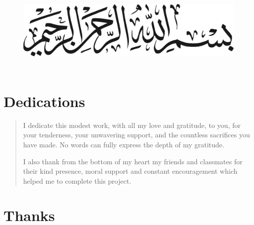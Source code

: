 \documentclass[12pt,a4paper]{report}
\begin{document}
\begin{figure}[H]
\centering
\includegraphics[width=6.6277in,height=1.65729in]{vertopal_d1b0b2209edd4c6aa8254f57daa0953b/media/image3.png}
\end{figure}


\clearpage
\hypertarget{dedications}{%
\section{\texorpdfstring{\textbf{Dedications}}{Dedications}}\label{dedications}}

\begin{quote}
I dedicate this modest work, with all my love and gratitude, to you, for
your tenderness, your unwavering support, and the countless sacrifices
you have made. No words can fully express the depth of my gratitude.

I also thank from the bottom of my heart my friends and classmates for
their kind presence, moral support and constant encouragement which
helped me to complete this project.
\end{quote}
\clearpage

\hypertarget{thanks}{%
\section{\texorpdfstring{\textbf{Thanks}}{Thanks}}\label{thanks}}
\end{document}
